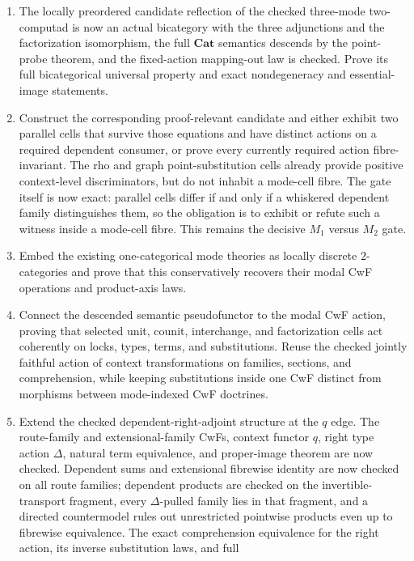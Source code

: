 \documentclass[11pt]{article}
\theoremstyle{definition}
\theoremstyle{remark}
\begin{document}
\begin{enumerate}
\item The locally preordered candidate reflection of the checked three-mode
  two-computad is now an actual bicategory with the three adjunctions and the
  factorization isomorphism, the full $\mathbf{Cat}$ semantics descends by the
  point-probe theorem, and the fixed-action mapping-out law is checked.  Prove
  its full bicategorical universal property and exact nondegeneracy and
  essential-image statements.
\item Construct the corresponding proof-relevant candidate and either exhibit
  two parallel cells that survive those equations and have distinct actions on
  a required dependent consumer, or prove every currently required action
  fibre-invariant.  The rho and graph point-substitution cells already provide
  positive context-level discriminators, but do not inhabit a mode-cell fibre.
  The gate itself is now exact: parallel cells differ if and only if a
  whiskered dependent family distinguishes them, so the obligation is to
  exhibit or refute such a witness inside a mode-cell fibre.  This remains
  the decisive $M_1$ versus $M_2$ gate.
\item Embed the existing one-categorical mode theories as locally discrete
  $2$-categories and prove that this conservatively recovers their modal CwF
  operations and product-axis laws.
\item Connect the descended semantic pseudofunctor to the modal CwF action,
  proving that selected unit, counit, interchange, and factorization cells act
  coherently on locks, types, terms, and substitutions.  Reuse the checked
  jointly faithful action of context transformations on families, sections,
  and comprehension, while keeping substitutions inside one CwF distinct from
  morphisms between mode-indexed CwF doctrines.
\item Extend the checked dependent-right-adjoint structure at the $q$ edge.
  The route-family and extensional-family CwFs, context functor $q$, right type
  action $\Delta$, natural term equivalence, and proper-image theorem are now
  checked.  Dependent sums and extensional fibrewise identity are now checked
  on all route families; dependent products are checked on the
  invertible-transport fragment, every $\Delta$-pulled family lies in that
  fragment, and a directed countermodel rules out unrestricted pointwise
  products even up to fibrewise equivalence.  The exact comprehension
  equivalence for the right action, its inverse substitution laws, and full

\end{enumerate}
\end{document}
